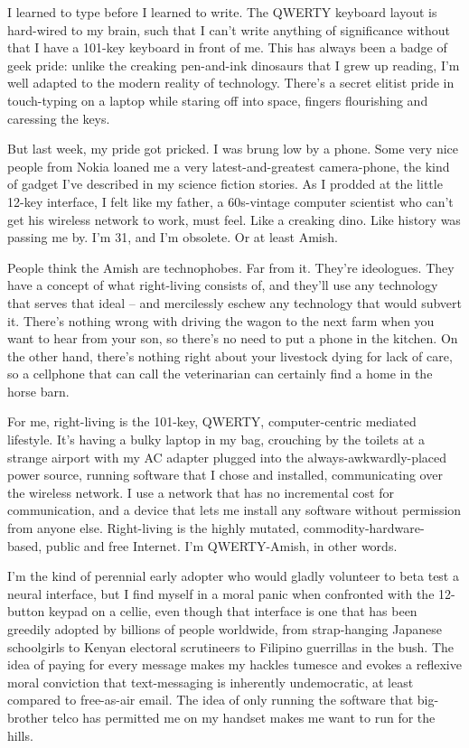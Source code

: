 I learned to type before I learned to write. The QWERTY keyboard
layout is hard-wired to my brain, such that I can't write anything
of significance without that I have a 101-key keyboard in front of
me. This has always been a badge of geek pride: unlike the creaking
pen-and-ink dinosaurs that I grew up reading, I'm well adapted to
the modern reality of technology. There's a secret elitist pride in
touch-typing on a laptop while staring off into space, fingers
flourishing and caressing the keys.

But last week, my pride got pricked. I was brung low by a phone.
Some very nice people from Nokia loaned me a very
latest-and-greatest camera-phone, the kind of gadget I've described
in my science fiction stories. As I prodded at the little 12-key
interface, I felt like my father, a 60s-vintage computer scientist
who can't get his wireless network to work, must feel. Like a
creaking dino. Like history was passing me by. I'm 31, and I'm
obsolete. Or at least Amish.

People think the Amish are technophobes. Far from it. They're
ideologues. They have a concept of what right-living consists of,
and they'll use any technology that serves that ideal -- and
mercilessly eschew any technology that would subvert it. There's
nothing wrong with driving the wagon to the next farm when you want
to hear from your son, so there's no need to put a phone in the
kitchen. On the other hand, there's nothing right about your
livestock dying for lack of care, so a cellphone that can call the
veterinarian can certainly find a home in the horse barn.

For me, right-living is the 101-key, QWERTY, computer-centric
mediated lifestyle. It's having a bulky laptop in my bag, crouching
by the toilets at a strange airport with my AC adapter plugged into
the always-awkwardly-placed power source, running software that I
chose and installed, communicating over the wireless network. I use
a network that has no incremental cost for communication, and a
device that lets me install any software without permission from
anyone else. Right-living is the highly mutated,
commodity-hardware- based, public and free Internet. I'm
QWERTY-Amish, in other words.

I'm the kind of perennial early adopter who would gladly volunteer
to beta test a neural interface, but I find myself in a moral panic
when confronted with the 12-button keypad on a cellie, even though
that interface is one that has been greedily adopted by billions of
people worldwide, from strap-hanging Japanese schoolgirls to Kenyan
electoral scrutineers to Filipino guerrillas in the bush. The idea
of paying for every message makes my hackles tumesce and evokes a
reflexive moral conviction that text-messaging is inherently
undemocratic, at least compared to free-as-air email. The idea of
only running the software that big-brother telco has permitted me
on my handset makes me want to run for the hills.

